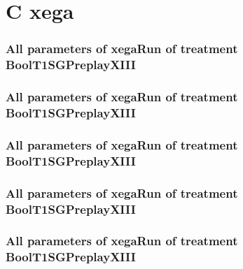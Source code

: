 \documentclass[18pt,c]{beamer}
\begin{document}
\clearpage
\section{C xega}

 \begin{frame}
 \fontsize{8pt}{9pt}\selectfont
 \frametitle{  All parameters of xegaRun of treatment BoolT1SGPreplayXIII 
 }

 \label{ExpCtParmTable016.tex}  
 \end{frame}


 \begin{frame}
 \fontsize{8pt}{9pt}\selectfont
 \frametitle{  All parameters of xegaRun of treatment BoolT1SGPreplayXIII 
 }

 \label{ExpCtParmTable017.tex}  
 \end{frame}


 \begin{frame}
 \fontsize{8pt}{9pt}\selectfont
 \frametitle{  All parameters of xegaRun of treatment BoolT1SGPreplayXIII 
 }

 \label{ExpCtParmTable018.tex}  
 \end{frame}


 \begin{frame}
 \fontsize{8pt}{9pt}\selectfont
 \frametitle{  All parameters of xegaRun of treatment BoolT1SGPreplayXIII 
 }

 \label{ExpCtParmTable019.tex}  
 \end{frame}


 \begin{frame}
 \fontsize{8pt}{9pt}\selectfont
 \frametitle{  All parameters of xegaRun of treatment BoolT1SGPreplayXIII 
 }

 \label{ExpCtParmTable020.tex}  
 \end{frame}
\end{document}
